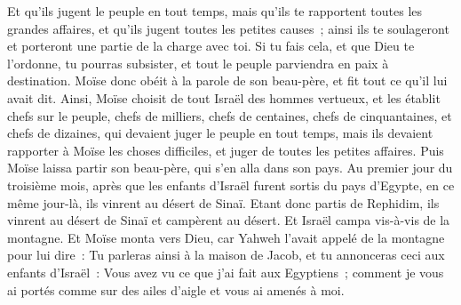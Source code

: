 \begin{multicols}{2}
Et qu'ils jugent le peuple en tout temps, mais qu'ils te rapportent toutes les grandes affaires, et qu'ils jugent toutes les petites causes~; ainsi ils te soulageront et porteront une partie de la charge avec toi.
Si tu fais cela, et que Dieu te l'ordonne, tu pourras subsister, et tout le peuple parviendra en paix à destination.
Moïse donc obéit à la parole de son beau-père, et fit tout ce qu'il lui avait dit.
Ainsi, Moïse choisit de tout Israël des hommes vertueux, et les établit chefs sur le peuple, chefs de milliers, chefs de centaines, chefs de cinquantaines, et chefs de dizaines,
qui devaient juger le peuple en tout temps, mais ils devaient rapporter à Moïse les choses difficiles, et juger de toutes les petites affaires.
Puis Moïse laissa partir son beau-père, qui s'en alla dans son pays.
\VerseOne{}Au premier jour du troisième mois, après que les enfants d'Israël furent sortis du pays d'Egypte, en ce même jour-là, ils vinrent au désert de Sinaï.
Etant donc partis de Rephidim, ils vinrent au désert de Sinaï et campèrent au désert. Et Israël campa vis-à-vis de la montagne.
Et Moïse monta vers Dieu, car Yahweh l'avait appelé de la montagne pour lui dire~: Tu parleras ainsi à la maison de Jacob, et tu annonceras ceci aux enfants d'Israël~:
Vous avez vu ce que j'ai fait aux Egyptiens~; comment je vous ai portés comme sur des ailes d'aigle et vous ai amenés à moi.

\end{multicols}
